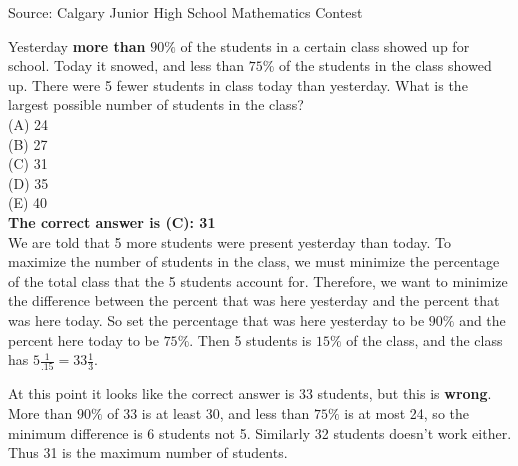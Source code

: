 \documentclass{article}
\begin{document}
\scriptsize
Source: Calgary Junior High School Mathematics Contest

\normalsize
Yesterday \textbf{more than} $90\%$ of the students in a certain class showed up for school. Today it snowed, and less than $75\%$ of the students in the class showed up. There were 5 fewer students in class today than yesterday. What is the largest possible number of students in the class?\\
(A) 24\\
(B) 27\\
(C) 31\\
(D) 35\\
(E) 40\\


\textbf{The correct answer is (C): 31}\\[1 ex]
We are told that 5 more students were present yesterday than today. To maximize the number of students in the class, we must minimize the percentage of the total class that the 5 students account for. Therefore, we want to minimize the difference between the percent that was here yesterday and the percent that was here today. So set the percentage that was here yesterday to be $90\%$ and the percent here today to be $75\%$. Then 5 students is $15\%$ of the class, and the class has $5\frac{1}{.15}=33\frac{1}{3}$.

At this point it looks like the correct answer is 33 students, but this is \textbf{wrong}. More than $90\%$ of 33 is at least 30, and less than $75\%$ is at most 24, so the minimum difference is 6 students not 5. Similarly 32 students doesn't work either. Thus 31 is the maximum number of students.
\\[5 ex]
\end{document}
